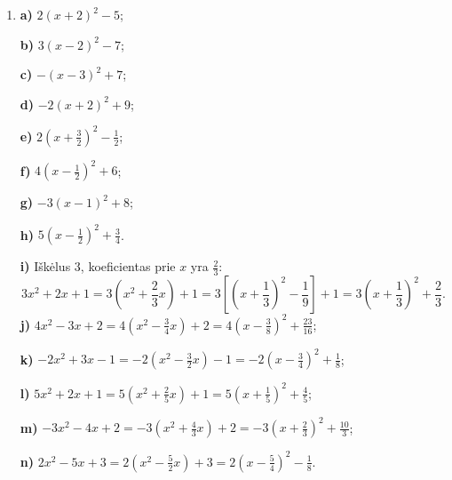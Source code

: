 \documentclass[12pt,a4paper]{article}
\begin{document}
\begin{enumerate}
\textbf{b)} $(x-4)^2-13$;

\textbf{c)} $(x+2)^2-7$;

\textbf{d)} $(x-5)^2$;

\textbf{e)} $(x+\frac{3}{2})^2-\frac{5}{4}$;

\textbf{f)} $(x-\frac{1}{2})^2-\frac{9}{4}$.
\item \textbf{a)} $2(x+2)^2-5$;

\textbf{b)} $3(x-2)^2-7$;

\textbf{c)} $-(x-3)^2+7$;

\textbf{d)} $-2(x+2)^2+9$;

\textbf{e)} $2(x+\frac{3}{2})^2-\frac{1}{2}$;

\textbf{f)} $4(x-\frac{1}{2})^2+6$;

\textbf{g)} $-3(x-1)^2+8$;

\textbf{h)} $5(x-\frac{1}{2})^2+\frac{3}{4}$.

\textbf{i)} Iškėlus $3$, koeficientas prie $x$ yra $\frac23$:
\[
3x^2+2x+1=3\left(x^2+\frac23x\right)+1
=3\left[\left(x+\frac13\right)^2-\frac19\right]+1
=3\left(x+\frac13\right)^2+\frac23.
\]
\textbf{j)} $4x^2-3x+2=4\left(x^2-\frac34x\right)+2=4\left(x-\frac38\right)^2+\frac{23}{16}$;

\textbf{k)} $-2x^2+3x-1=-2\left(x^2-\frac32x\right)-1=-2\left(x-\frac34\right)^2+\frac18$;

\textbf{l)} $5x^2+2x+1=5\left(x^2+\frac25x\right)+1=5\left(x+\frac15\right)^2+\frac45$;

\textbf{m)} $-3x^2-4x+2=-3\left(x^2+\frac43x\right)+2=-3\left(x+\frac23\right)^2+\frac{10}{3}$;

\textbf{n)} $2x^2-5x+3=2\left(x^2-\frac52x\right)+3=2\left(x-\frac54\right)^2-\frac18$.


\end{enumerate}
\end{document}
